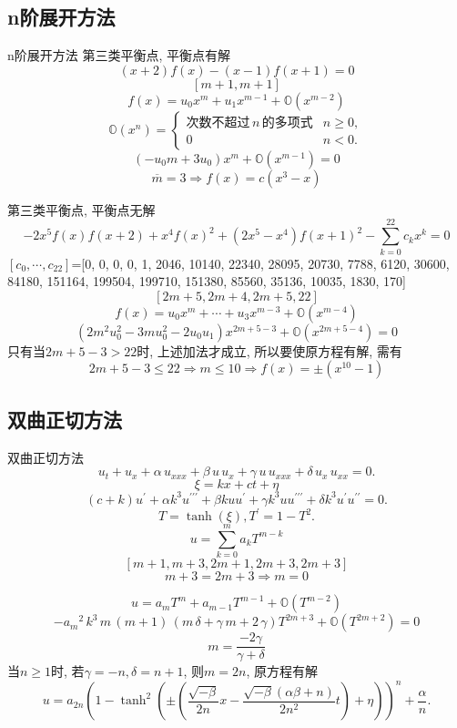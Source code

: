 \documentclass[handout]{beamer}
\newcommand{\sbrace}[1]{\left(#1\right)}
\newcommand{\OO}{\ensuremath{\mathbb O}}%
\begin{document}
\subsection{n阶展开方法}
\begin{frame}{n阶展开方法}
第三类平衡点, 平衡点有解 
\[
    (x+2)f(x)-(x-1)f(x+1)=0
\]
\[
    [m+1,m+1]
\]
\[
    f(x)=u_0 x^m + u_1 x^{m-1} + \OO(x^{m-2})
\]
\[
    \OO\sbrace{x^n}=\left\{
    \begin{array}{cl}
    \text{次数不超过}\,n\,\text{的多项式} & n\ge 0, \\
    0                                    & n<0 .
    \end{array}
    \right.
\]
\[
    (-u_0 m+3u_0)x^m+\OO(x^{m-1})=0
\]
\[
    \overline{m}=3 \Rightarrow f(x)=c(x^3-x)
\]
\end{frame}

\begin{frame}
第三类平衡点, 平衡点无解
\[
    -2x^5f(x)f(x+2)+x^4f(x)^2+(2x^5-x^4)f(x+1)^2-\sum_{k=0}^{22}{c_k x^k}=0
\]
$[c_0,\cdots,c_{22}]$=[0, 0, 0, 0, 1, 2046, 10140, 22340, 28095, 20730, 7788, 6120, 30600, 84180, 151164, 199504, 199710, 151380, 85560, 35136, 10035, 1830, 170]
\[
    [2m+5,2m+4,2m+5,22]
\]
\[
    f(x)=u_0 x^m +\cdots +u_3 x^{m-3}+\OO(x^{m-4})
\]
\[
    \sbrace{ 2m^2u_0^2-3mu_0^2-2u_0u_1 } x^{2m+5-3}+\OO(x^{2m+5-4})=0
\]
只有当$2m+5-3>22$时, 上述加法才成立, 所以要使原方程有解, 需有
\[
    2m+5-3 \le 22 \Rightarrow m\le 10 \Rightarrow f(x)=\pm (x^{10}-1)
\]
\end{frame}

\subsection{双曲正切方法}
\begin{frame}{双曲正切方法}
\begin{equation*}
{{u}_{t}}+{{u}_{x}}+\alpha\,{{u}_{xxx}}+\beta\,u\,{{u}_{x}}+\gamma\,u\,{{u}_{xxx}}+\delta\,{{u}_{x}}\,{{u}_{xx}}=0. 
\end{equation*}
\[
  \xi=kx+ct+\eta
\]
\[
(c+k)u^\prime + \alpha k^3 u^{\prime\prime\prime}+\beta k u u^\prime+\gamma k^3 u u^{\prime\prime\prime}+\delta k^3 u^\prime u^{\prime\prime} = 0. 
\]
\[
  T=\tanh(\xi), T^\prime=1-T^2 . 
\]
\[
  u=\sum_{k=0}^{m}{a_k T^{m-k}}
\]
\[
  [m+1,m+3,2m+1,2m+3,2m+3]
\]
\[
  m+3=2m+3\Rightarrow m=0
\]
\end{frame}

\begin{frame}
\[
  u=a_m T^m + a_{m-1} T^{m-1} + \OO(T^{m-2})
\]
\[
  -{{{a}_{m}}}^{2}\,{k}^{3}\,m\,\left( m+1\right) \,\left( m\,\delta+\gamma\,m+2\,\gamma\right)T^{2m+3}+\OO(T^{2m+2})=0
\]
\[
  m=\frac{-2 \gamma}{\gamma+\delta}
\]
当$n\ge 1$时, 若$\gamma=-n,\delta=n+1$, 则$m=2n$, 原方程有解
\begin{equation*}
u=a_{2n} \sbrace{1-\tanh^2\sbrace{\pm\sbrace{\frac{\sqrt{-\beta}}{2n}x-\frac{\sqrt{-\beta}(\alpha\beta+n)}{2n^2}t}+\eta}}^n+\frac{\alpha}{n} . 
\end{equation*}
\end{frame}
\end{document}
